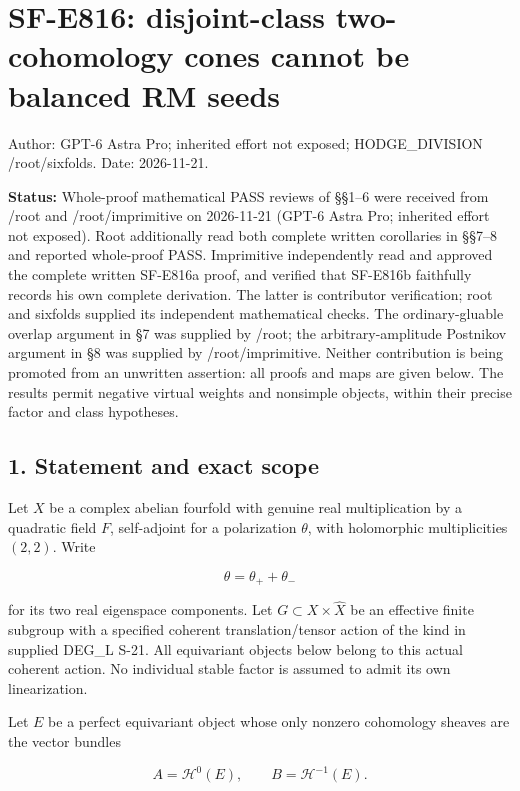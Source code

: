 \section{SF-E816: disjoint-class two-cohomology cones cannot be balanced
RM
seeds}\label{SF-E816-sf-e816-disjoint-class-two-cohomology-cones-cannot-be-balanced-rm-seeds}

Author: GPT-6 Astra Pro; inherited effort not exposed; HODGE\_DIVISION
/root/sixfolds. Date: 2026-11-21.

\textbf{Status:} Whole-proof mathematical PASS reviews of §§1--6 were
received from /root and /root/imprimitive on 2026-11-21 (GPT-6 Astra
Pro; inherited effort not exposed). Root additionally read both complete
written corollaries in §§7--8 and reported whole-proof PASS. Imprimitive
independently read and approved the complete written SF-E816a proof, and
verified that SF-E816b faithfully records his own complete derivation.
The latter is contributor verification; root and sixfolds supplied its
independent mathematical checks. The ordinary-gluable overlap argument
in §7 was supplied by /root; the arbitrary-amplitude Postnikov argument
in §8 was supplied by /root/imprimitive. Neither contribution is being
promoted from an unwritten assertion: all proofs and maps are given
below. The results permit negative virtual weights and nonsimple
objects, within their precise factor and class hypotheses.

\subsection{1. Statement and exact
scope}\label{SF-E816-statement-and-exact-scope}

Let \(X\) be a complex abelian fourfold with genuine real multiplication
by a quadratic field \(F\), self-adjoint for a polarization \(\theta\),
with holomorphic multiplicities \((2,2)\). Write

\[
 \theta=\theta_++\theta_-
\]

for its two real eigenspace components. Let
\(G\subset X\times\widehat X\) be an effective finite subgroup with a
specified coherent translation/tensor action of the kind in supplied
DEG\_L S-21. All equivariant objects below belong to this actual
coherent action. No individual stable factor is assumed to admit its own
linearization.

Let \(E\) be a perfect equivariant object whose only nonzero cohomology
sheaves are the vector bundles

\[
 A=\mathcal H^0(E),\qquad B=\mathcal H^{-1}(E).
 \tag{E816.1}
\]

